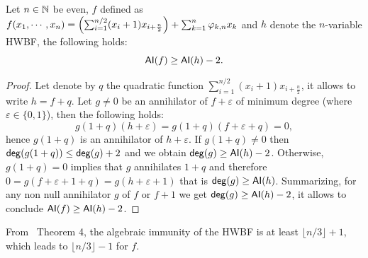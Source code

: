 \documentclass[11pt]{llncs}
\begin{document}
\begin{proposition}
	Let $n\in \mathbb{N}$ be even, $f$ defined as
	$f(x_1,\cdots,x_n)=\left(\sum_{i=1}^{n/2} (x_i+1) x_{i+\frac{n}{2}}\right) + \sum_{k=1}^n \varphi_{k,n} x_k$ and $h$ denote the $n$-variable HWBF, the following holds:
	\[\mathsf{AI}(f)\ge \mathsf{AI}(h)-2.\]
\end{proposition}
\begin{proof}
	Let denote by $q$ the quadratic function $\sum_{i=1}^{n/2} (x_i+1) x_{i+\frac{n}{2}}$, it allows to write $h=f+q$. 
	Let $g\neq 0$ be an annihilator of $f+ \varepsilon$ of minimum degree (where $\varepsilon \in \{0,1\}$), then the following holds:
	\[g (1+q) (h+\varepsilon) = g(1+q) (f+\varepsilon + q)=0, \]
	hence $g (1+q)$ is an annihilator of $h+ \varepsilon$. 
	If $g (1+q)\ne 0$ then $\mathsf{deg}(g(1+q)) \le \mathsf{deg}(g)+2$ and we obtain $\mathsf{deg}(g)\ge \mathsf{AI}(h) -2$. 
	Otherwise, $g (1+q)= 0$ implies that $g$ annihilates $1+q$ and therefore $0=g (f+\varepsilon + 1 +q)=g(h+ \varepsilon +1)$ that is $\mathsf{deg}(g)\ge \mathsf{AI}(h)$. 
	Summarizing, for any non null annihilator $g$ of $f$ or $f+1$ we get $\mathsf{deg}(g)\ge \mathsf{AI}(h)-2$, it allows to conclude $\mathsf{AI}(f)\ge \mathsf{AI}(h)-2$.
\end{proof}

From~\cite{DAM:WCST14} Theorem 4, the algebraic immunity of the HWBF is at least $\lfloor n/3\rfloor +1$, which leads to $\lfloor n/3\rfloor -1$ for $f$.



\newpage



\ifnum{}


\else


\fi
\end{document}
